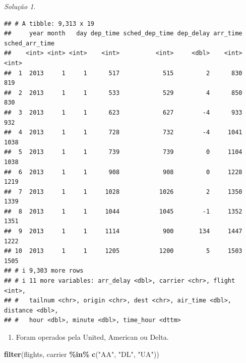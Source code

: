 \documentclass[
]{latex/krantz}
\newenvironment{Shaded}{\begin{snugshade}}{\end{snugshade}}
\newcommand{\FunctionTok}[1]{\textcolor[rgb]{0.13,0.29,0.53}{\textbf{#1}}}
\newcommand{\NormalTok}[1]{#1}
\newcommand{\SpecialCharTok}[1]{\textcolor[rgb]{0.81,0.36,0.00}{\textbf{#1}}}
\newcommand{\StringTok}[1]{\textcolor[rgb]{0.31,0.60,0.02}{#1}}
\providecommand{\tightlist}{%
  \setlength{\itemsep}{0pt}\setlength{\parskip}{0pt}}
\theoremstyle{definition}
\theoremstyle{definition}
\theoremstyle{definition}
\theoremstyle{definition}
\theoremstyle{remark}
\newtheorem*{solution}{Solução}
\begin{document}
\begin{solution}
\begin{verbatim}
## # A tibble: 9,313 x 19
##     year month   day dep_time sched_dep_time dep_delay arr_time sched_arr_time
##    <int> <int> <int>    <int>          <int>     <dbl>    <int>          <int>
##  1  2013     1     1      517            515         2      830            819
##  2  2013     1     1      533            529         4      850            830
##  3  2013     1     1      623            627        -4      933            932
##  4  2013     1     1      728            732        -4     1041           1038
##  5  2013     1     1      739            739         0     1104           1038
##  6  2013     1     1      908            908         0     1228           1219
##  7  2013     1     1     1028           1026         2     1350           1339
##  8  2013     1     1     1044           1045        -1     1352           1351
##  9  2013     1     1     1114            900       134     1447           1222
## 10  2013     1     1     1205           1200         5     1503           1505
## # i 9,303 more rows
## # i 11 more variables: arr_delay <dbl>, carrier <chr>, flight <int>,
## #   tailnum <chr>, origin <chr>, dest <chr>, air_time <dbl>, distance <dbl>,
## #   hour <dbl>, minute <dbl>, time_hour <dttm>
\end{verbatim}

\begin{enumerate}
\def\labelenumi{\alph{enumi}.}
\setcounter{enumi}{2}
\tightlist
\item
  Foram operados pela United, American ou Delta.
\end{enumerate}

\begin{Shaded}
\begin{Highlighting}[]
\FunctionTok{filter}\NormalTok{(flights, carrier }\SpecialCharTok{\%in\%} \FunctionTok{c}\NormalTok{(}\StringTok{"AA"}\NormalTok{, }\StringTok{"DL"}\NormalTok{, }\StringTok{"UA"}\NormalTok{))}
\end{Highlighting}
\end{Shaded}


\end{solution}
\end{document}
